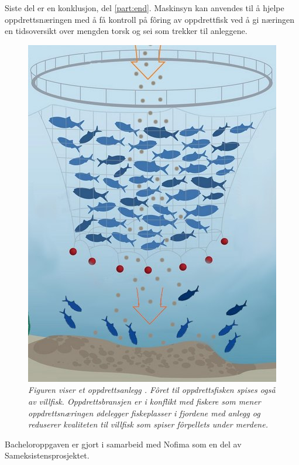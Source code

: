 Siste del er en konklusjon, del \ref{part:end}. Maskinsyn kan anvendes til å hjelpe oppdrettsnæringen med å få kontroll på fôring av oppdrettfisk ved å gi næringen en tidsoversikt over mengden torsk og sei som trekker til anleggene.

\begin{figure} 
\begin{center} 
\includegraphics[scale=0.7]{figures/merder-fisk}
\caption{\small \sl Figuren viser et oppdrettsanlegg \cite{Spruill 2011 s. 12}. Fôret til oppdrettsfisken spises også av villfisk. Oppdrettsbransjen er i konflikt med fiskere som mener oppdrettsnæringen ødelegger fiskeplasser i fjordene med anlegg og reduserer kvaliteten til villfisk som spiser fôrpellets under merdene. \cite{Olsen m.fl. 2018} \label{fig:anlegg}} 
\end{center} 
\end{figure} 

Bacheloroppgaven er gjort i samarbeid med Nofima som en del av Sameksistensprosjektet. \cite{Robertsen 2020}